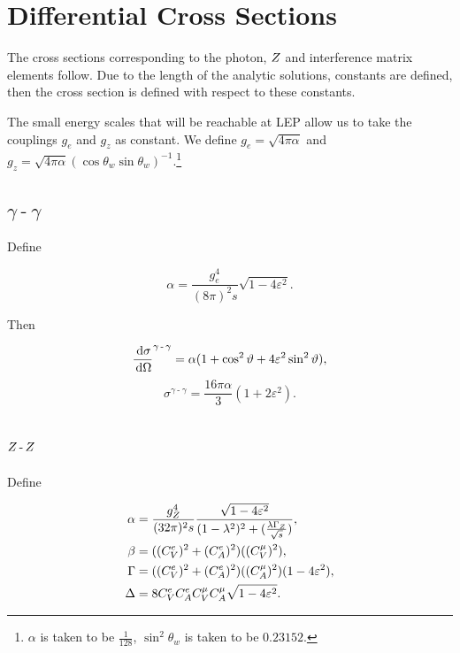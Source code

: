 \documentclass[]{article}
\begin{document}
\newpage

\appendix
\section{Differential Cross Sections}\label{app:differentials}

The cross sections corresponding to the photon, $Z $ and interference matrix elements follow. Due to the length of the analytic solutions, constants are defined, then the cross section is defined with respect to these constants.

The small energy scales that will be reachable at LEP allow us to take the couplings $g_{e}$ and $g_{z}$ as constant. We define $g_{e}=\sqrt{4\pi\alpha}$ and $g_{z}=\sqrt{4\pi\alpha}(\cos{\theta_{w}}\sin{\theta_{w}})^{-1}$.\footnote{$\alpha$ is taken to be $\frac{1}{128}$, $\sin^{2}{\theta_{w}}$ is taken to be $0.23152$.}

\subsection{$\gamma\operatorname{-}\gamma$}

Define

$$
\alpha = \frac{g_{e}^{4}}{(8\pi)^{2}s} \sqrt{1-4\varepsilon^{2}}.
$$

Then

$$
\frac{\,\operatorname{d}\!{\sigma}}{\,\operatorname{d}\!{\Omega}}^{\gamma\operatorname{-}\gamma} = \alpha (1 + \cos^{2}{\vartheta} + 4\varepsilon^{2}\sin^{2}{\vartheta}),
$$
\begin{equation}
\sigma^{\gamma\operatorname{-}\gamma} = \frac{16\pi\alpha}{3}(1 + 2\varepsilon^{2}).
\end{equation}

\subsection{$Z \operatorname{-}Z $}

Define

\begin{align*}
\alpha &= \frac{g_{\Zzero}^{4}}{(32\pi)^{2}s} \frac{\sqrt{1-4\varepsilon^{2}}}{(1-\lambda^{2})^{2} + (\frac{\lambda\GZ}{\rts})},
\\
\beta &= ((C_{V}^{e})^{2} + (C_{A}^{e})^{2})((C_{V}^{\mu})^{2}),
\\
\Gamma &= ((C_{V}^{e})^{2} + (C_{A}^{e})^{2})((C_{A}^{\mu})^{2})(1-4\varepsilon^{2}),
\\
\Delta &= 8C_{V}^{e}C_{A}^{e}C_{V}^{\mu}C_{A}^{\mu}\sqrt{1-4\varepsilon^{2}}.
\end{align*}
\end{document}
